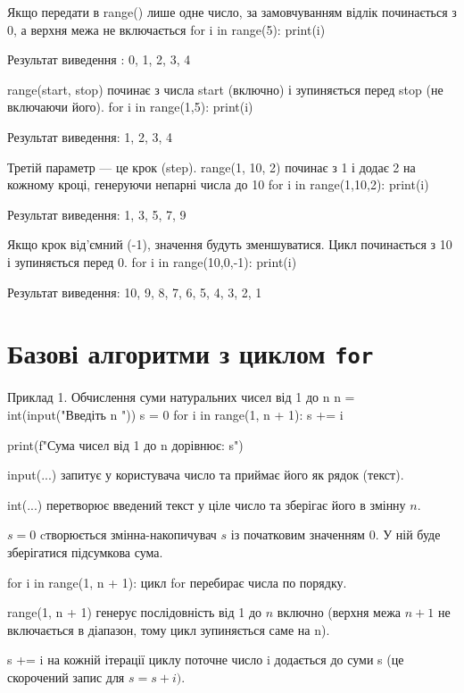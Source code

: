 \begin{py}{Якщо передати в range() лише одне число, за замовчуванням відлік починається з 0, а верхня межа не включається}
for i in range(5):
    print(i)
\end{py}
Результат виведення : 0, 1, 2, 3, 4


\begin{py}{range(start, stop) починає з числа start (включно) і зупиняється перед stop (не включаючи його).}
for i in range(1,5):
    print(i)
\end{py}
Результат виведення: 1, 2, 3, 4

\begin{py}{Третій параметр — це крок (step). range(1, 10, 2) починає з 1 і додає 2 на кожному кроці, генеруючи непарні числа до 10}
for i in range(1,10,2):
    print(i)
\end{py}
Результат виведення: 1, 3, 5, 7, 9

\begin{py}{Якщо крок від'ємний (-1), значення будуть зменшуватися. Цикл починається з 10 і зупиняється перед 0.}
for i in range(10,0,-1):
    print(i)
\end{py}
Результат виведення: 10, 9, 8, 7, 6, 5, 4, 3, 2, 1

\section{Базові алгоритми з циклом \texttt{for}}

\begin{py}{Приклад 1. Обчислення суми натуральних чисел від 1 до n}
n = int(input("Введіть n "))
s = 0
for i in range(1, n + 1):
    s += i

print(f"Сума чисел від 1 до {n} дорівнює: {s}")
\end{py}

input(...) запитує у користувача число та приймає його як рядок (текст).

int(...) перетворює введений текст у ціле число та зберігає його в змінну $n$.

$s = 0$ cтворюється змінна-накопичувач $s$ із початковим значенням 0. У ній буде зберігатися підсумкова сума.

for i in range(1, n + 1): цикл for перебирає числа по порядку.

range(1, n + 1) генерує послідовність від 1 до $n$ включно (верхня межа $n + 1$ не включається в діапазон, тому цикл зупиняється саме на n).

s += i  на кожній ітерації циклу поточне число i додається до суми s (це скорочений запис для $s = s + i).$

